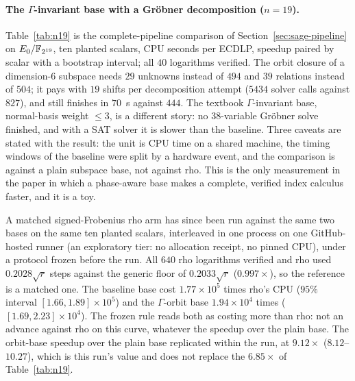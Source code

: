 \paragraph{The $\Gamma$-invariant base with a Gr\"obner decomposition ($n=19$).}
Table~\ref{tab:n19} is the complete-pipeline comparison of
Section~\ref{sec:sage-pipeline} on $E_0/\mathbb{F}_{2^{19}}$, ten planted
scalars, CPU seconds per ECDLP, speedup paired by scalar with a
bootstrap interval; all $40$ logarithms
verified.
The orbit closure of a dimension-$6$ subspace needs $29$ unknowns
instead of $494$ and $39$ relations instead of $504$; it pays with
$19$ shifts per decomposition attempt ($5434$ solver calls against
$827$), and still finishes in $70$~s against $444$. The textbook
$\Gamma$-invariant base, normal-basis weight $\le3$, is a different
story: no $38$-variable Gr\"obner solve finished, and with a SAT solver
it is slower than the baseline. Three caveats are stated with the
result: the unit is CPU time on a shared machine, the timing windows
of the baseline were split by a hardware event, and the comparison is
against a plain subspace base, not against rho. This is the only
measurement in the paper in which a phase-aware base makes a complete,
verified index calculus faster, and it is a toy.

A matched signed-Frobenius rho arm has since been run against the same
two bases on the same ten planted scalars, interleaved in one process
on one GitHub-hosted runner (an exploratory tier: no allocation receipt,
no pinned CPU), under a protocol frozen before the run. All $640$ rho
logarithms verified and rho used $0.2028\sqrt r$ steps against the
generic floor of $0.2033\sqrt r$ ($0.997\times$), so the reference is a
matched one. The baseline base cost $1.77\times10^5$ times rho's CPU
($95\%$ interval $[1.66,1.89]\times10^5$) and the $\Gamma$-orbit base
$1.94\times10^4$ times ($[1.69,2.23]\times10^4$). The frozen rule reads
both as costing more than rho: not an advance against rho on this curve,
whatever the speedup over the plain base. The orbit-base speedup over the
plain base replicated within the run, at $9.12\times$ ($8.12$--$10.27$),
which is this run's value and does not replace the $6.85\times$ of
Table~\ref{tab:n19}.

